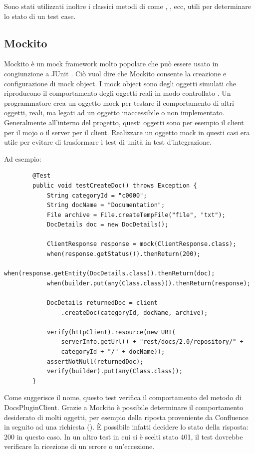     Sono stati utilizzati inoltre i classici metodi di  come , ,  ecc, utili per determinare lo stato di un test case.

    \subsection{Mockito}
    Mockito è un mock framework molto popolare che può essere usato in congiunzione a JUnit \cite{site:mockito}. 
    Ciò vuol dire che Mockito consente la creazione e configurazione di mock object.
    I mock object sono degli oggetti simulati che riproducono il comportamento degli oggetti reali in modo controllato \cite{site:mock}.
    Un programmatore crea un oggetto mock per testare il comportamento di altri oggetti, reali, ma legati ad un oggetto inaccessibile o non implementato.
    Generalmente all'interno del progetto, questi oggetti sono per esempio il client per il mojo o il server per il client.
    Realizzare un oggetto mock in questi casi era utile per evitare di trasformare i test di unità in test d'integrazione.

    Ad esempio:

    \begin{lstlisting} 
        @Test
        public void testCreateDoc() throws Exception {
            String categoryId = "c0000";
            String docName = "Documentation";
            File archive = File.createTempFile("file", "txt");
            DocDetails doc = new DocDetails();

            ClientResponse response = mock(ClientResponse.class);
            when(response.getStatus()).thenReturn(200);
            when(response.getEntity(DocDetails.class)).thenReturn(doc);
            when(builder.put(any(Class.class))).thenReturn(response);

            DocDetails returnedDoc = client
                .createDoc(categoryId, docName, archive);

            verify(httpClient).resource(new URI(
                serverInfo.getUrl() + "rest/docs/2.0/repository/" + 
                categoryId + "/" + docName));
            assertNotNull(returnedDoc);
            verify(builder).put(any(Class.class));
        }
    \end{lstlisting}
    Come suggerisce il nome, questo test verifica il comportamento del metodo  di DocsPluginClient.
    Grazie a Mockito è possibile determinare il comportamento desiderato di molti oggetti, per esempio della riposta proveniente da Confluence in seguito ad una richiesta ().
    È possibile infatti decidere lo stato della risposta: 200 in questo caso.
    In un altro test in cui si è scelti stato 401, il test dovrebbe verificare la ricezione di un errore o un'eccezione.

